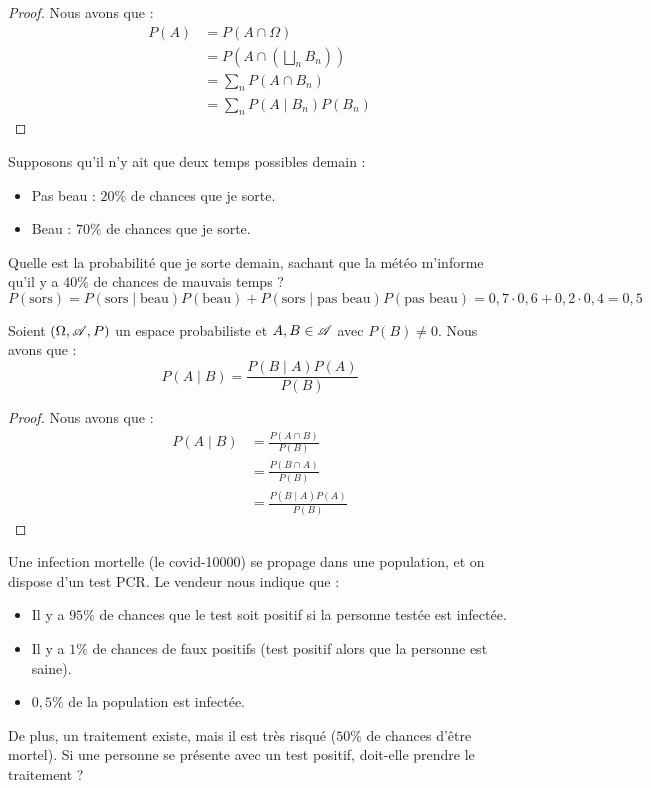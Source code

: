 \begin{proof}
    Nous avons que :
    \begin{align*}
        P(A) &= P(A\cap \Omega)\\
        &= P\left(A\cap \left(\bigsqcup_n B_n\right)\right)\\ 
        &= \sum_{n} P(A\cap B_n)\\ 
        &= \sum_n P(A\mid B_n)P(B_n)
    \end{align*}  
\end{proof}



\begin{exemple}
    Supposons qu'il n'y ait que deux temps possibles demain :
    \begin{itemize}
        \item Pas beau : $20\%$ de chances que je sorte.
        \item Beau : $70\%$ de chances que je sorte.
    \end{itemize}
    Quelle est la probabilité que je sorte demain, sachant que la météo m'informe qu'il y a $40\%$ de chances de mauvais temps ?
    \[
    P(\text{sors}) = P(\text{sors}\mid \text{beau})P(\text{beau}) + P(\text{sors}\mid \text{pas beau})P(\text{pas beau}) = 0{,}7\cdot 0{,}6 + 0{,}2\cdot 0{,}4 = 0{,}5
    \]
\end{exemple}

\begin{proposition}
    Soient $(\Omega,\mathscr{A}, P)$ un espace probabiliste et $A,B\in \mathscr{A}$ avec $P(B)\neq 0$. Nous avons que :
    \[
    P(A\mid B)= \frac{P(B\mid A)P(A)}{P(B)}
    \]
\end{proposition}

\begin{proof}
    Nous avons que :
    \begin{align*}
       P(A\mid B) &= \frac{P(A\cap B)}{P(B)} \\
       &= \frac{P(B\cap A)}{P(B)} \\
       &= \frac{P(B\mid A)P(A)}{P(B)}
    \end{align*}   
\end{proof}

\begin{exemple}
    Une infection mortelle (le covid-10000) se propage dans une population, et on dispose d'un test PCR. Le vendeur nous indique que :
    \begin{itemize}
        \item Il y a $95\%$ de chances que le test soit positif si la personne testée est infectée.
        \item Il y a $1\%$ de chances de faux positifs (test positif alors que la personne est saine).
        \item $0{,}5\%$ de la population est infectée.
    \end{itemize}
    De plus, un traitement existe, mais il est très risqué ($50\%$ de chances d'être mortel). Si une personne se présente avec un test positif, doit-elle prendre le traitement ?
\end{exemple}

